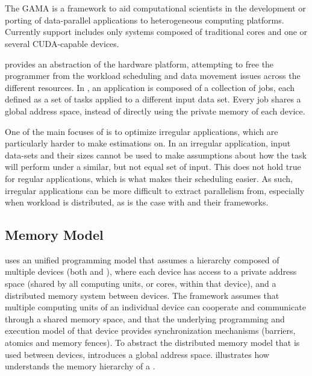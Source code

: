 \documentclass[main.tex]{subfiles}
\begin{document}
\section{\gama} \label{chapter:gama}

The \acf{GAMA} is a framework to aid computational scientists in the development or porting of data-parallel applications to heterogeneous computing platforms. Currently \hetplat support includes only systems composed of traditional \cpus cores and one or several CUDA-capable \gpu devices.

\gama provides an abstraction of the hardware platform, attempting to free the programmer from the workload scheduling and data movement issues across the different resources. In \gama, an application is composed of a collection of jobs, each defined as a set of tasks applied to a different input data set. Every job shares a global address space, instead of directly using the private memory of each device.

One of the main focuses of \gama is to optimize irregular applications, which are particularly harder to make estimations on. In an irregular application, input data-sets and their sizes cannot be used to make assumptions about how the task will perform under a similar, but not equal set of input. This does not hold true for regular applications, which is what makes their scheduling easier. As such, irregular applications can be more difficult to extract parallelism from, especially when workload is distributed, as is the case with \hetplats and their frameworks.


\subsection{Memory Model}

\gama uses an unified programming model that assumes a hierarchy composed of multiple devices (both \cpus and \gpus), where each device has access to a private address space (shared by all computing units, or cores, within that device), and a distributed memory system between devices. The framework assumes that multiple computing units of an individual device can cooperate and communicate through a shared memory space, and that the underlying programming and execution model of that device provides synchronization mechanisms (barriers, atomics and memory fences).
To abstract the distributed memory model that is used between devices, \gama introduces a global address space.  illustrates how \gama understands the memory hierarchy of a \hetplat.
\end{document}
